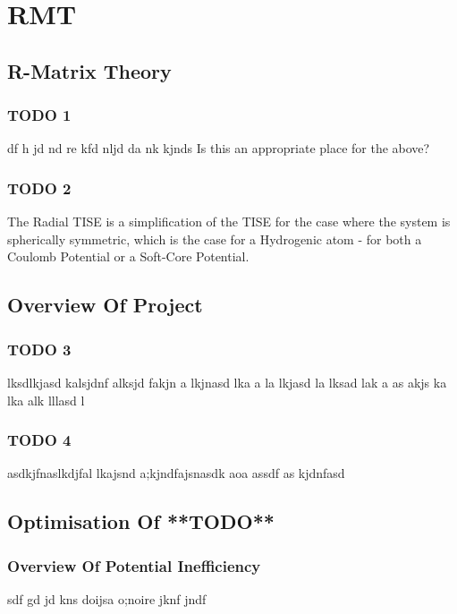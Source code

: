 
\chapter{RMT} %

\label{Chapter5} %


\section{R-Matrix Theory}
\subsection{TODO 1}
df h jd nd re kfd nljd da nk kjnds 
Is this an appropriate place for the above?

\subsection{TODO 2}

The Radial TISE is a simplification of the TISE for the case where the system is spherically symmetric, which is the case for a Hydrogenic atom - for both a Coulomb Potential or a Soft-Core Potential.

\section{Overview Of Project}
\subsection{TODO 3}
lksdlkjasd kalsjdnf alksjd fakjn a lkjnasd lka a la lkjasd la lksad lak a
as akjs ka lka alk lllasd l
\subsection{TODO 4}
asdkjfnaslkdjfal lkajsnd a;kjndfajsnasdk aoa 
assdf as kjdnfasd

\section{Optimisation Of **TODO**}
\subsection{Overview Of Potential Inefficiency}
sdf gd jd kns doijsa o;noire jknf jndf 

